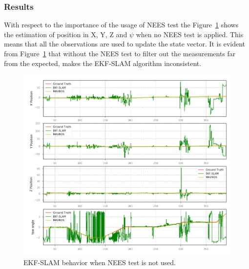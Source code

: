 \subsubsection{Results}
\label{subsubsec:chapter3:simulation:d:results}
With respect to the importance of the usage of \ac{NEES} test the Figure~\ref{fig:chapter3:simulation:d:no-nees-test} shows the estimation of position in X, Y, Z and $\psi$ when no \ac{NEES} test is applied. This means that all the observations are used to update the state vector. It is evident from Figure~\ref{fig:chapter3:simulation:d:no-nees-test} that without the \ac{NEES} test to filter out the measurements far from the expected, makes the EKF-SLAM algorithm inconsistent.\\
\begin{figure}
    \centering
    \includegraphics[width=\textwidth]{Images/fig24-no-nees-test.png}
    \caption[EKF-SLAM behavior when NEES test is not used.]{EKF-SLAM behavior when \ac{NEES} test is not used.}
    \label{fig:chapter3:simulation:d:no-nees-test}
\end{figure}

